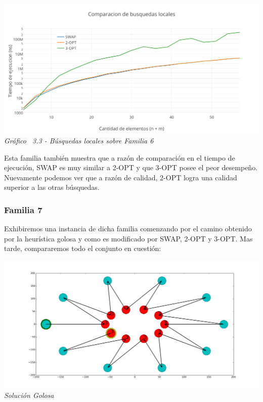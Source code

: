 \vspace*{0.3cm} \vspace*{0.3cm}
  \begin{center}
 \includegraphics[scale=0.5]{./EJ3/comparacionbusquedaslocalessinorden.png}\\
 {            \textit{Gráfico \ 3.3 - Búsquedas locales sobre Familia 6}}
  \end{center}
  \vspace*{0.3cm}



Esta familia también muestra que a raz\'on de comparación en el tiempo de ejecución, SWAP es muy similar a 2-OPT y que 3-OPT posee el peor desempeño. Nuevamente podemos ver que a razón de calidad, 2-OPT logra una calidad superior a las otras búsquedas.



\subsubsection*{Familia 7}

Exhibiremos una instancia de dicha familia comenzando por el camino obtenido por la heur\'istica golosa y como es modificado por SWAP, 2-OPT y 3-OPT. Mas tarde, compararemos todo el conjunto en cuesti\'on:

\vspace*{0.3cm} \vspace*{0.3cm}
  \begin{center}
 \includegraphics[scale=0.3]{./EJ3/anillosgoloso.png}\\
 {            \textit{Soluci\'on Golosa}}
  \end{center}
  \vspace*{0.3cm}

